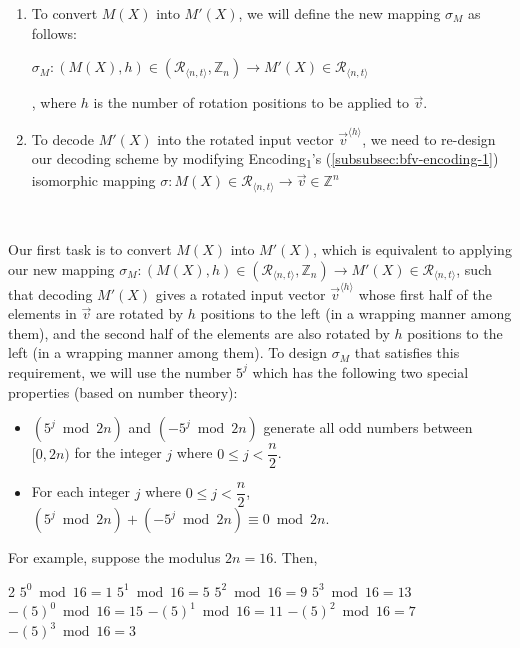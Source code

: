\begin{enumerate}[leftmargin=3\parindent]
\item To convert $M(X)$ into $M'(X)$, we will define the new mapping $\sigma_M$ as follows: 

$\sigma_M : (M(X), h) \in (\mathcal{R}_{\langle n, t \rangle}, \mathbb{Z}_{n}) \longrightarrow M'(X) \in \mathcal{R}_{\langle n, t \rangle}$

, where $h$ is the number of rotation positions to be applied to $\vec{v}$.
\item To decode $M'(X)$ into the rotated input vector $\vec{v}^{\langle h \rangle}$, we need to re-design our decoding scheme by modifying \textsf{Encoding\textsubscript{1}}'s (\autoref{subsubsec:bfv-encoding-1}) isomorphic mapping $\sigma : M(X) \in \mathcal{R}_{\langle n, t \rangle} \longrightarrow \vec{v} \in \mathbb{Z}^n$ 
\end{enumerate}

$ $

 Our first task is to convert $M(X)$ into $M'(X)$, which is equivalent to applying our new mapping $\sigma_M : (M(X), h) \in (\mathcal{R}_{\langle n, t \rangle}, \mathbb{Z}_{n}) \longrightarrow M'(X) \in \mathcal{R}_{\langle n, t \rangle}$, such that decoding $M'(X)$ gives a rotated input vector $\vec{v}^{\langle h \rangle}$ whose first half of the elements in $\vec{v}$ are rotated by $h$ positions to the left (in a wrapping manner among them), and the second half of the elements are also rotated by $h$ positions to the left (in a wrapping manner among them). To design $\sigma_M$ that satisfies this requirement, we will use the number $5^j$ which has the following two special properties (based on number theory):
\begin{itemize}
\item $(5^j \bmod 2n)$ and $(-5^j \bmod 2n)$ generate all odd numbers between $[0, 2n)$ for the integer $j$ where $0 \leq j < \dfrac{n}{2}$. 
\item For each integer $j$ where $0 \leq j < \dfrac{n}{2}$, $(5^j \bmod 2n) + (-5^j \bmod 2n) \equiv 0 \bmod 2n$. 
\end{itemize}
For example, suppose the modulus $2n = 16$. Then, 

\begin{multicols}{2}
\noindent $5^0 \bmod 16 = 1$
\newline $5^1 \bmod 16 = 5$
\newline $5^2 \bmod 16 = 9$
\newline $5^3 \bmod 16 = 13$
\newline $-(5)^0 \bmod 16 = 15$
\newline $-(5)^1 \bmod 16 = 11$
\newline $-(5)^2 \bmod 16 = 7$
\newline $-(5)^3 \bmod 16 = 3$
\end{multicols}


